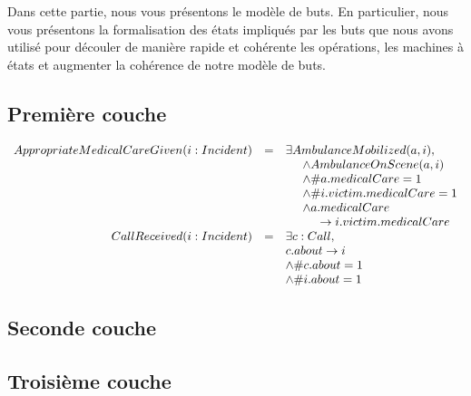 Dans cette partie, nous vous présentons le modèle de buts. En 
particulier, nous vous présentons la formalisation des états impliqués
par les buts que nous avons
utilisé pour découler de manière rapide et cohérente les opérations, les
machines à états et augmenter la cohérence de notre modèle de buts.

\subsection{Première couche}
\begin{equation*}
\begin{array}{rcl}
AppropriateMedicalCareGiven(i:Incident)
& = & \exists AmbulanceMobilized(a, i), \\
&   & \hspace{0.5cm} \wedge AmbulanceOnScene(a, i) \\
&   & \hspace{0.5cm} \wedge \#a.medicalCare = 1 \\
&   & \hspace{0.5cm} \wedge \#i.victim.medicalCare = 1 \\
&   & \hspace{0.5cm} \wedge a.medicalCare \\
&   & \hspace{1cm} \rightarrow i.victim.medicalCare \\ 
CallReceived(i:Incident)
& = & \exists c: Call, \\
&   & c.about \rightarrow i \\
&   & \wedge \#c.about = 1 \\
&   & \wedge \#i.about = 1 \\
\end{array}
\end{equation*}

\subsection{Seconde couche}

\subsection{Troisième couche}

